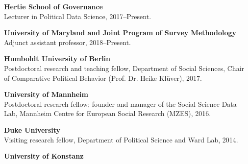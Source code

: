 \documentclass[11pt,article,oneside]{memoir}   %
\begin{document}
\setlength{\leftskip}{0cm}

\noindent \textbf{Hertie School of Governance} \\

\setlength{\leftskip}{1cm}
\vspace{-0.15in}
\noindent  Lecturer in Political Data Science, 2017--Present. \vspace{0.1in}

\setlength{\leftskip}{0cm}

\noindent \textbf{University of Maryland and Joint Program of Survey Methodology} \\

\setlength{\leftskip}{1cm}
\vspace{-0.15in}
\noindent  Adjunct assistant professor, 2018--Present. \vspace{0.1in}

\setlength{\leftskip}{0cm}

\noindent \textbf{Humboldt University of Berlin} \\

\setlength{\leftskip}{1cm}
\vspace{-0.15in}
\noindent  Postdoctoral research and teaching fellow, Department of Social Sciences, Chair of Comparative Political Behavior (Prof. Dr. Heike Kl\"uver), 2017. \vspace{0.1in}

\setlength{\leftskip}{0cm}

\noindent \textbf{University of Mannheim} \\

\setlength{\leftskip}{1cm}
\vspace{-0.15in}
\noindent  Postdoctoral research fellow; founder and manager of the Social Science Data Lab, Mannheim Centre for European Social Research (MZES), 2016. \vspace{0.1in}

\setlength{\leftskip}{0cm}

\noindent \textbf{Duke University} \\

\setlength{\leftskip}{1cm}
\vspace{-0.15in}
\noindent  Visiting research fellow, Department of Political Science and Ward Lab, 2014. \vspace{0.1in}
 
\setlength{\leftskip}{0cm}

\noindent \textbf{University of Konstanz} \\
\end{document}
